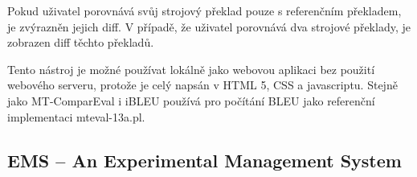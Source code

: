 Pokud uživatel porovnává svůj strojový překlad pouze s referenčním překladem,
  je zvýrazněn jejich diff.
V případě, že uživatel porovnává dva strojové překlady,
  je zobrazen diff těchto překladů.

Tento nástroj je možné používat lokálně jako webovou aplikaci bez použití webového serveru,
  protože je celý napsán v HTML 5, CSS a javascriptu.
Stejně jako MT-ComparEval i iBLEU používá pro počítání BLEU jako referenční implementaci mteval-13a.pl.

\subsection{EMS -- An Experimental Management System}
